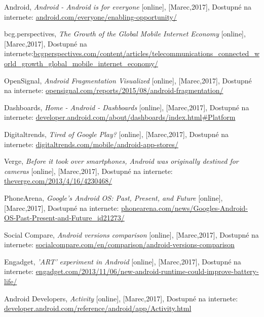 \begin{thebibliography}{99}                                
\label{literatura}

Android, \textit{Android - Android is for everyone} [online], [Marec,2017], Dostupné na internete:  \url{android.com/everyone/enabling-opportunity/}

bcg.perspectives, \textit{The Growth of the Global Mobile Internet Economy} [online], [Marec,2017], Dostupné na internete:\url{bcgperspectives.com/content/articles/telecommunications_connected_world_growth_global_mobile_internet_economy/}


OpenSignal, \textit{Android Fragmentation Visualized} [online], [Marec,2017], Dostupné na internete: \url{opensignal.com/reports/2015/08/android-fragmentation/}


Dashboards, \textit{Home - Android - Dashboards} [online], [Marec,2017], Dostupné na internete: \url{developer.android.com/about/dashboards/index.html#Platform}

Digitaltrends, \textit{ Tired of Google Play?} [online], [Marec,2017], Dostupné na internete: \url{digitaltrends.com/mobile/android-app-stores/}

Verge, \textit{ Before it took over smartphones, Android was originally destined for cameras} [online], [Marec,2017], Dostupné na internete: \url{theverge.com/2013/4/16/4230468/}


PhoneArena, \textit{ Google's Android OS: Past, Present, and Future} [online], [Marec,2017], Dostupné na internete: \url{phonearena.com/news/Googles-Android-OS-Past-Present-and-Future_id21273/}

Social Compare, \textit{Android versions comparison} [online], [Marec,2017], Dostupné na internete: 
\url{socialcompare.com/en/comparison/android-versions-comparison}

 
Engadget, \textit{'ART' experiment in Android} [online], [Marec,2017], Dostupné na internete: 
\url{engadget.com/2013/11/06/new-android-runtime-could-improve-battery-life/}

Android Developers, \textit{Activity} [online], [Marec,2017], Dostupné na internete: 
\url{developer.android.com/reference/android/app/Activity.html}


\end{thebibliography}
